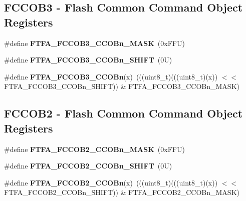 \subsection*{F\+C\+C\+O\+B3 -\/ Flash Common Command Object Registers}
\begin{DoxyCompactItemize}
\item 
\mbox{\label{group___f_t_f_a___register___masks_gae1057e6e0ff5441696b4246e99fbd33f}} 
\#define {\bfseries F\+T\+F\+A\+\_\+\+F\+C\+C\+O\+B3\+\_\+\+C\+C\+O\+Bn\+\_\+\+M\+A\+SK}~(0x\+F\+F\+U)
\item 
\mbox{\label{group___f_t_f_a___register___masks_ga0ee905ea83a52a6a22d12666387f266b}} 
\#define {\bfseries F\+T\+F\+A\+\_\+\+F\+C\+C\+O\+B3\+\_\+\+C\+C\+O\+Bn\+\_\+\+S\+H\+I\+FT}~(0\+U)
\item 
\mbox{\label{group___f_t_f_a___register___masks_gaab7c14d906b7e4a47fde00d6aaa1ecdf}} 
\#define {\bfseries F\+T\+F\+A\+\_\+\+F\+C\+C\+O\+B3\+\_\+\+C\+C\+O\+Bn}(x)~(((uint8\+\_\+t)(((uint8\+\_\+t)(x)) $<$$<$ F\+T\+F\+A\+\_\+\+F\+C\+C\+O\+B3\+\_\+\+C\+C\+O\+Bn\+\_\+\+S\+H\+I\+FT)) \& F\+T\+F\+A\+\_\+\+F\+C\+C\+O\+B3\+\_\+\+C\+C\+O\+Bn\+\_\+\+M\+A\+SK)
\end{DoxyCompactItemize}
\subsection*{F\+C\+C\+O\+B2 -\/ Flash Common Command Object Registers}
\begin{DoxyCompactItemize}
\item 
\mbox{\label{group___f_t_f_a___register___masks_gafce9dd30cc49db588976cffd40ff31a3}} 
\#define {\bfseries F\+T\+F\+A\+\_\+\+F\+C\+C\+O\+B2\+\_\+\+C\+C\+O\+Bn\+\_\+\+M\+A\+SK}~(0x\+F\+F\+U)
\item 
\mbox{\label{group___f_t_f_a___register___masks_gaf5731dc9ee3c6ce6fdd7c31a20bb0e6c}} 
\#define {\bfseries F\+T\+F\+A\+\_\+\+F\+C\+C\+O\+B2\+\_\+\+C\+C\+O\+Bn\+\_\+\+S\+H\+I\+FT}~(0\+U)
\item 
\mbox{\label{group___f_t_f_a___register___masks_ga0b76c510573ac191f77fea543c3d36aa}} 
\#define {\bfseries F\+T\+F\+A\+\_\+\+F\+C\+C\+O\+B2\+\_\+\+C\+C\+O\+Bn}(x)~(((uint8\+\_\+t)(((uint8\+\_\+t)(x)) $<$$<$ F\+T\+F\+A\+\_\+\+F\+C\+C\+O\+B2\+\_\+\+C\+C\+O\+Bn\+\_\+\+S\+H\+I\+FT)) \& F\+T\+F\+A\+\_\+\+F\+C\+C\+O\+B2\+\_\+\+C\+C\+O\+Bn\+\_\+\+M\+A\+SK)
\end{DoxyCompactItemize}
